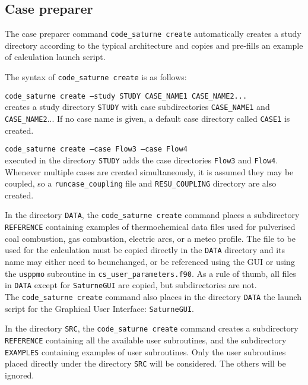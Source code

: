 {{{%
\subsection{Case preparer}
\label{prg_cscreate}%
The case preparer command \texttt{code\_saturne~create} automatically creates a
study directory according to the typical architecture and copies and
pre-fills an example of calculation launch script.

The syntax of \texttt{code\_saturne~create} is as follows:

\noindent
\texttt{code\_saturne~create --study STUDY CASE\_NAME1 CASE\_NAME2...}\\
creates a study directory \texttt{STUDY} with case subdirectories
\texttt{CASE\_NAME1} and \texttt{CASE\_NAME2}...
If no case name is given, a default case directory called \texttt{CASE1} is
created.

\noindent
\texttt{code\_saturne~create --case Flow3 --case Flow4}\\
executed in the directory \texttt{STUDY} adds the case directories
\texttt{Flow3} and \texttt{Flow4}. Whenever multiple cases are created simultaneously, it is assumed they may be coupled, so a \texttt{runcase\_coupling} file and \texttt{RESU\_COUPLING} directory are also created.

In the directory \texttt{DATA}, the \texttt{code\_saturne~create} command
places a subdirectory \texttt{REFERENCE} containing examples of thermochemical data files used for pulverised coal combustion, gas combustion, electric arcs, or a meteo profile. The file to be used for the calculation must be copied directly in the \texttt{DATA} directory and its name may either need to beunchanged, or be referenced using the GUI or using the \texttt{usppmo} subroutine in \texttt{cs\_user\_parameters.f90}. As a rule of thumb, all files in \texttt{DATA} except for \texttt{SaturneGUI} are copied, but subdirectories are not.\\
The \texttt{code\_saturne~create} command also places in the directory
\texttt{DATA} the launch script for the Graphical User Interface:
\texttt{SaturneGUI}.

In the directory \texttt{SRC}, the \texttt{code\_saturne~create} command creates a
subdirectory \texttt{REFERENCE} containing all the available user subroutines,
and the subdirectory \texttt{EXAMPLES} containing examples of user subroutines.
Only the user subroutines placed directly under
the directory \texttt{SRC} will be considered. The others will be ignored.

}}}
